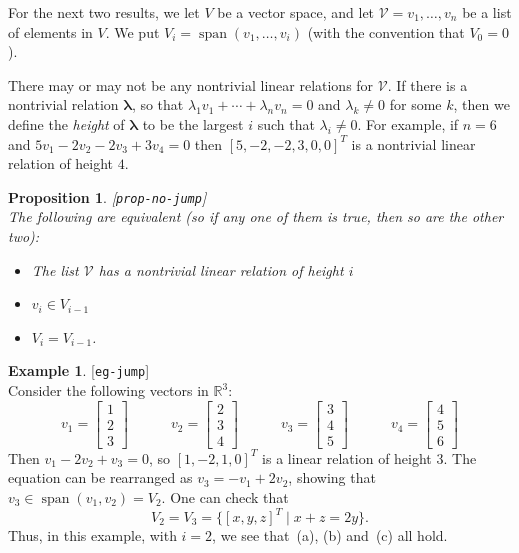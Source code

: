 \documentclass{amsart}
\newcommand{\lbl}[1]{\label{#1}\textup{[\texttt{#1}]}\ \\}
\newcommand{\lbl}{\label}
\newcommand{\R}         {{\mathbb{R}}}
\newcommand{\spn}       {\operatorname{span}}
\newcommand{\bbm}       {\left[\begin{matrix}}
\newcommand{\ebm}       {\end{matrix}\right]}
\newcommand{\lm}        {\lambda}
\newcommand{\st}        {\;|\;}
\newcommand{\vlm}       {\mathbf{\lambda}}
\newcommand{\CV}        {{\mathcal{V}}}
\renewcommand{\:}       {\colon}
\newtheorem{proposition}[theorem]{Proposition}
\theoremstyle{definition}
\newtheorem{example}[theorem]{Example}
\begin{document}
For the next two results, we let $V$ be a vector space, and
let $\CV=v_1,\dotsc,v_n$ be a list of elements in $V$.  We
put $V_i=\spn(v_1,\dotsc,v_i)$ (with the convention that
$V_0=0$).  

There may or may not be any nontrivial linear relations for
$\CV$.  If there is a nontrivial relation $\vlm$, so
that $\lm_1v_1+\dotsb+\lm_nv_n=0$ and $\lm_k\neq 0$ for some
$k$, then we define the \emph{height} of $\vlm$ to be
the largest $i$ such that $\lm_i\neq 0$.  For example, if $n=6$
and $5v_1-2v_2-2v_3+3v_4=0$ then $[5,-2,-2,3,0,0]^T$ is a
nontrivial linear relation of height $4$.

\begin{proposition}\lbl{prop-no-jump}
 The following are equivalent (so if any one of them is
 true, then so are the other two):
 \begin{itemize}
  \item[(a)] The list $\CV$ has a nontrivial linear relation
   of height $i$
  \item[(b)] $v_i\in V_{i-1}$
  \item[(c)] $V_i=V_{i-1}$.
 \end{itemize}
\end{proposition}
\begin{example}\lbl{eg-jump}
 Consider the following vectors in $\R^3$:
 \[
  v_1 = \bbm 1 \\ 2 \\ 3 \ebm \hspace{3em}
  v_2 = \bbm 2 \\ 3 \\ 4 \ebm \hspace{3em}
  v_3 = \bbm 3 \\ 4 \\ 5 \ebm \hspace{3em}
  v_4 = \bbm 4 \\ 5 \\ 6 \ebm
 \]
 Then $v_1-2v_2+v_3=0$, so $[1,-2,1,0]^T$ is a linear relation
 of height $3$.  The equation can be rearranged as
 $v_3=-v_1+2v_2$, showing that $v_3\in\spn(v_1,v_2)=V_2$.
 One can check that
 \[ V_2 = V_3 = \{[x,y,z]^T \st x+z=2y\}. \]
 Thus, in this example, with $i=2$, we see that~(a), (b)
 and~(c) all hold.
\end{example}
\end{document}
